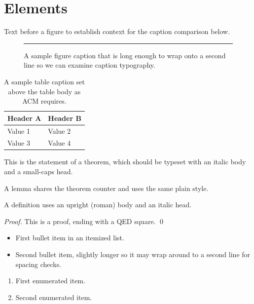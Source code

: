 \documentclass[acmsmall,nonacm]{acmart}
\begin{document}
\section{Elements}
Text before a figure to establish context for the caption comparison below.

\begin{figure}[h]
\centering
\rule{4cm}{2cm}
\caption{A sample figure caption that is long enough to wrap onto a second line so we can examine caption typography.}
\label{fig:sample}
\end{figure}

\begin{table}[h]
\caption{A sample table caption set above the table body as ACM requires.}
\label{tab:sample}
\begin{tabular}{ll}
\toprule
Header A & Header B \\
\midrule
Value 1 & Value 2 \\
Value 3 & Value 4 \\
\bottomrule
\end{tabular}
\end{table}

\begin{theorem}\label{thm:main}
This is the statement of a theorem, which should be typeset with an italic body and a small-caps head.
\end{theorem}

\begin{lemma}
A lemma shares the theorem counter and uses the same plain style.
\end{lemma}

\begin{definition}
A definition uses an upright (roman) body and an italic head.
\end{definition}

\begin{proof}
This is a proof, ending with a QED square. \qed
\end{proof}

\begin{itemize}
\item First bullet item in an itemized list.
\item Second bullet item, slightly longer so it may wrap around to a second line for spacing checks.
\end{itemize}

\begin{enumerate}
\item First enumerated item.
\item Second enumerated item.
\end{enumerate}
\end{document}
